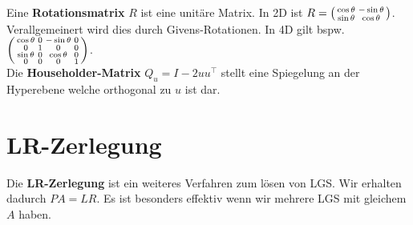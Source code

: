 \documentclass[a4paper,10pt]{article}
\begin{document}
Eine \textbf{Rotationsmatrix} $R$ ist eine unitäre Matrix. In 2D ist $R = \begin{psmallmatrix*}
  \cos \theta & -\sin \theta \\
  \sin \theta & \cos \theta
\end{psmallmatrix*}$. Verallgemeinert wird dies durch Givens-Rotationen. In 4D gilt bspw. $\begin{psmallmatrix}
  \cos \theta & 0 & -\sin \theta & 0 \\
  0 & 1 & 0 & 0 \\
  \sin \theta & 0 & \cos \theta & 0 \\
  0 & 0 & 0 & 1
\end{psmallmatrix}$.\\

Die \textbf{Householder-Matrix} $Q_u = I - 2uu^\top$ stellt eine Spiegelung an der Hyperebene welche orthogonal zu $u$ ist dar.

\section{LR-Zerlegung}

Die \textbf{LR-Zerlegung} ist ein weiteres Verfahren zum lösen von LGS. Wir erhalten dadurch $PA = LR$. Es ist besonders effektiv wenn wir mehrere LGS mit gleichem $A$ haben.
\end{document}
